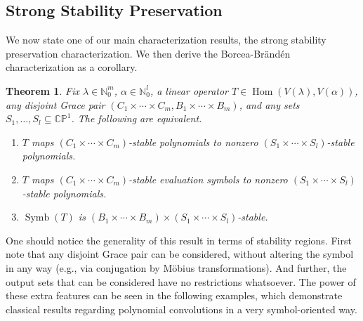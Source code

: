 \documentclass{article}
\newtheorem{theorem}{Theorem}[section]
\theoremstyle{definition}
\theoremstyle{plain}
\newcommand{\N}{\mathbb{N}}
\newcommand{\CP}{\mathbb{CP}}
\DeclareMathOperator{\Symb}{Symb}
\DeclareMathOperator{\Hom}{Hom}
\begin{document}
\subsection{Strong Stability Preservation}\label{str_Cstab_subsect}

We now state one of our main characterization results, the strong stability preservation characterization. We then derive the Borcea-Br{\"a}nd{\'e}n characterization as a corollary.

\begin{theorem}\label{Cops_graces}
    Fix $\lambda \in \N_0^m$, $\alpha \in \N_0^l$, a linear operator $T \in \Hom(V(\lambda),V(\alpha))$, any disjoint Grace pair $(C_1 \times \cdots \times C_m, B_1 \times \cdots \times B_m)$, and any sets $S_1,\ldots,S_l \subseteq \CP^1$. The following are equivalent.
    \begin{enumerate}[label=(\roman*)]
        \item $T$ maps $(C_1 \times \cdots \times C_m)$-stable polynomials to nonzero $(S_1 \times \cdots \times S_l)$-stable polynomials.
        \item $T$ maps $(C_1 \times \cdots \times C_m)$-stable evaluation symbols to nonzero $(S_1 \times \cdots \times S_l)$-stable polynomials.
        \item $\Symb(T)$ is $(B_1 \times \cdots \times B_m) \times (S_1 \times \cdots \times S_l)$-stable.
    \end{enumerate}
\end{theorem}

One should notice the generality of this result in terms of stability regions. First note that any disjoint Grace pair can be considered, without altering the symbol in any way (e.g., via conjugation by M{\"o}bius transformations). And further, the output sets that can be considered have no restrictions whatsoever. The power of these extra features can be seen in the following examples, which demonstrate classical results regarding polynomial convolutions in a very symbol-oriented way.
\end{document}
